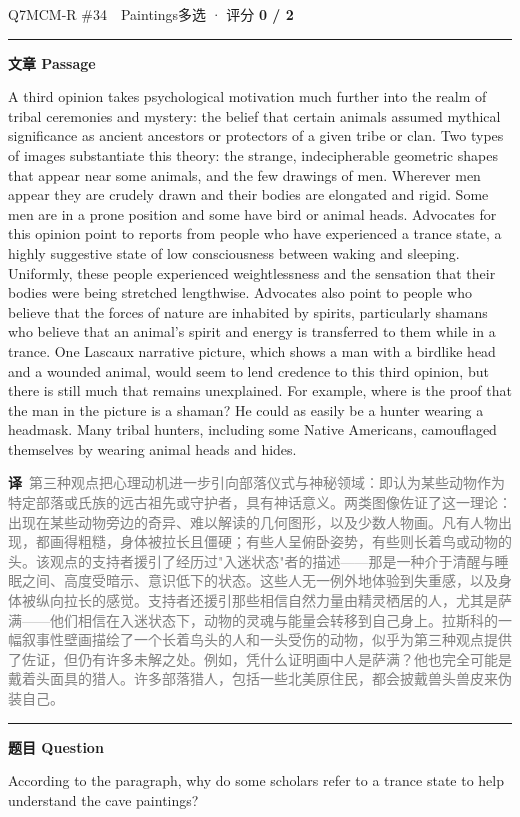 \documentclass[11pt]{article}
\newcommand{\ptesub}[1]{%
  \par\needspace{2\baselineskip}\smallskip
  {\color{cAccent}\rule[-0.2ex]{3pt}{1.05em}}\hspace{6pt}%
  {\bfseries\color{cHead}#1}\par\nopagebreak\smallskip}
\newcommand{\zh}[1]{{\footnotesize\textcolor{cNote}{\textbf{译}}\ \textcolor{gray}{#1}}}
\begin{document}
\begin{qblock}{Q7\quad MCM-R \#34\ \ Paintings}{多选 · 评分 \textcolor{cAccent}{\bfseries 0 / 2}}
\ptesub{文章 Passage}
\begin{promptbox}
A third opinion takes psychological motivation much further into the realm of tribal ceremonies and mystery: the belief that certain animals assumed mythical significance as ancient ancestors or protectors of a given tribe or clan. Two types of images substantiate this theory: the strange, indecipherable geometric shapes that appear near some animals, and the few drawings of men. Wherever men appear they are crudely drawn and their bodies are elongated and rigid. Some men are in a prone position and some have bird or animal heads. Advocates for this opinion point to reports from people who have experienced a trance state, a highly suggestive state of low consciousness between waking and sleeping. Uniformly, these people experienced weightlessness and the sensation that their bodies were being stretched lengthwise. Advocates also point to people who believe that the forces of nature are inhabited by spirits, particularly shamans who believe that an animal's spirit and energy is transferred to them while in a trance. One Lascaux narrative picture, which shows a man with a birdlike head and a wounded animal, would seem to lend credence to this third opinion, but there is still much that remains unexplained. For example, where is the proof that the man in the picture is a shaman? He could as easily be a hunter wearing a headmask. Many tribal hunters, including some Native Americans, camouflaged themselves by wearing animal heads and hides.
\end{promptbox}
\zh{第三种观点把心理动机进一步引向部落仪式与神秘领域：即认为某些动物作为特定部落或氏族的远古祖先或守护者，具有神话意义。两类图像佐证了这一理论：出现在某些动物旁边的奇异、难以解读的几何图形，以及少数人物画。凡有人物出现，都画得粗糙，身体被拉长且僵硬；有些人呈俯卧姿势，有些则长着鸟或动物的头。该观点的支持者援引了经历过"入迷状态"者的描述——那是一种介于清醒与睡眠之间、高度受暗示、意识低下的状态。这些人无一例外地体验到失重感，以及身体被纵向拉长的感觉。支持者还援引那些相信自然力量由精灵栖居的人，尤其是萨满——他们相信在入迷状态下，动物的灵魂与能量会转移到自己身上。拉斯科的一幅叙事性壁画描绘了一个长着鸟头的人和一头受伤的动物，似乎为第三种观点提供了佐证，但仍有许多未解之处。例如，凭什么证明画中人是萨满？他也完全可能是戴着头面具的猎人。许多部落猎人，包括一些北美原住民，都会披戴兽头兽皮来伪装自己。}
\ptesub{题目 Question}
\begin{notebox}According to the paragraph, why do some scholars refer to a trance state to help understand the cave paintings?\end{notebox}

\end{qblock}
\end{document}
